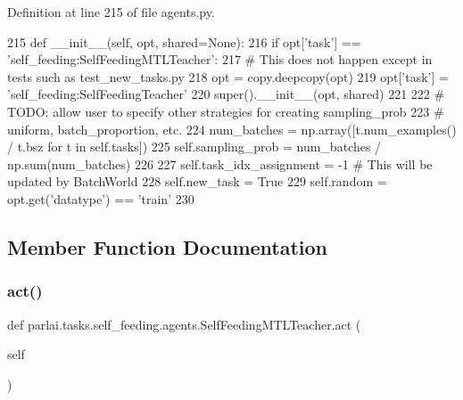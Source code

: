 Definition at line 215 of file agents.\+py.


\begin{DoxyCode}
215     \textcolor{keyword}{def }\_\_init\_\_(self, opt, shared=None):
216         \textcolor{keywordflow}{if} opt[\textcolor{stringliteral}{'task'}] == \textcolor{stringliteral}{'self\_feeding:SelfFeedingMTLTeacher'}:
217             \textcolor{comment}{# This does not happen except in tests such as test\_new\_tasks.py}
218             opt = copy.deepcopy(opt)
219             opt[\textcolor{stringliteral}{'task'}] = \textcolor{stringliteral}{'self\_feeding:SelfFeedingTeacher'}
220         super().\_\_init\_\_(opt, shared)
221 
222         \textcolor{comment}{# TODO: allow user to specify other strategies for creating sampling\_prob}
223         \textcolor{comment}{# uniform, batch\_proportion, etc.}
224         num\_batches = np.array([t.num\_examples() / t.bsz \textcolor{keywordflow}{for} t \textcolor{keywordflow}{in} self.tasks])
225         self.sampling\_prob = num\_batches / np.sum(num\_batches)
226 
227         self.task\_idx\_assignment = -1  \textcolor{comment}{# This will be updated by BatchWorld}
228         self.new\_task = \textcolor{keyword}{True}
229         self.random = opt.get(\textcolor{stringliteral}{'datatype'}) == \textcolor{stringliteral}{'train'}
230 
\end{DoxyCode}


\subsection{Member Function Documentation}
\mbox{\label{classparlai_1_1tasks_1_1self__feeding_1_1agents_1_1SelfFeedingMTLTeacher_ac4ee43a50c54d2033be6eb5731650ab3}} 
\subsubsection{\texorpdfstring{act()}{act()}}
{\footnotesize\ttfamily def parlai.\+tasks.\+self\+\_\+feeding.\+agents.\+Self\+Feeding\+M\+T\+L\+Teacher.\+act (\begin{DoxyParamCaption}\item[{}]{self }\end{DoxyParamCaption})}



